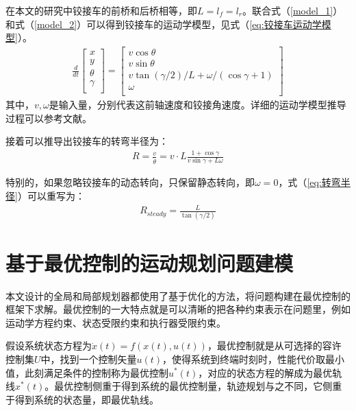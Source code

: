 \documentclass[master,academic]{ysuthesis} %
\begin{document}
	在本文的研究中铰接车的前桥和后桥相等，即$L=l_f=l_r$。联合式（\ref{model_1}）和式（\ref{model_2}）可以得到铰接车的运动学模型，见式（\ref{eq:铰接车运动学模型}）。
	\begin{equation}
		\begin{aligned}
			\frac{d}{dt}\left[ \begin{array}{c}
				x\\
				y\\
				\theta\\
				\gamma\\
			\end{array} \right] =\left[ \begin{array}{c}
				v\cos\theta\\
				v\sin\theta\\
				v\tan( \gamma /2 ) /L+\omega /( \cos\gamma +1 )\\
				\omega\\
			\end{array} \right] 
		\end{aligned}
		\label{eq:铰接车运动学模型}
	\end{equation}
	其中，$v,\omega$是输入量，分别代表这前轴速度和铰接角速度。详细的运动学模型推导过程可以参考文献\cite{corke2001steering}。

	接着可以推导出铰接车的转弯半径为：
	\begin{equation}
		\begin{aligned}
			R = \frac{v}{\dot{\theta}} = v\cdot L \frac{1+\cos\gamma}{v\sin\gamma+L\omega }
		\end{aligned}
		\label{eq:转弯半径}
	\end{equation}


	特别的，如果忽略铰接车的动态转向，只保留静态转向，即$\omega=0$，式（\ref{eq:转弯半径}）可以重写为：
	\begin{equation}
		\begin{aligned}
			R_{steady} = \frac{L}{\tan(\gamma/2)} 
		\end{aligned}
	\end{equation}
		
	\section{基于最优控制的运动规划问题建模}
	本文设计的全局和局部规划器都使用了基于优化的方法，将问题构建在最优控制的框架下求解。最优控制的一大特点就是可以清晰的把各种约束表示在问题里，例如运动学方程约束、状态受限约束和执行器受限约束。
	
	假设系统状态方程为$\dot{x}(t)=f(x(t),u(t))$，最优控制就是从可选择的容许控制集$U$中，找到一个控制矢量$u(t)$，使得系统到终端时刻时，性能代价取最小值，此刻满足条件的控制称为最优控制$u^{*}(t)$，对应的状态方程的解成为最优轨线$x^{*}(t)$。最优控制侧重于得到系统的最优控制量，轨迹规划与之不同，它侧重于得到系统的状态量，即最优轨线。
	
\end{document}
